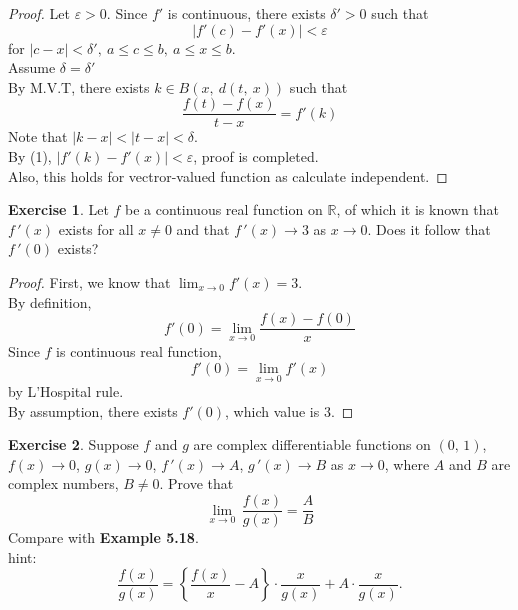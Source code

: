 \documentclass[12pt]{book}
\theoremstyle{definition}
\newtheorem{exercise}{Exercise}
\newcommand{\R}{\mathbb{R}}
\begin{document}
	\begin{proof}
		Let $\varepsilon>0$.
		Since $f'$ is continuous, there exists $\delta'>0$ such that
		\begin{equation}
			|f'(c)-f'(x)|<\varepsilon
		\end{equation}
		for $|c-x|<\delta',~a\leq c\leq b,~a\leq x\leq b$.\\
		Assume $\delta=\delta'$\\
		By M.V.T, there exists $k\in B(x,~ d(t,~x))$ such that $$\dfrac{f(t)-f(x)}{t-x}=f'(k)$$
		Note that $|k-x|<|t-x|<\delta$.\\
		By (1), $|f'(k)-f'(x)|<\varepsilon$, proof is completed.\\
		Also, this holds for vectror-valued function as calculate independent.
	\end{proof}
	\newpage
	\begin{exercise}
		Let $f$ be a continuous real function on $\R$, of which it is known that $f\,'(x)$ exists for all $x\neq 0$ and that $f\,'(x)\rightarrow3$ as $x\rightarrow0$. Does it follow that $f\,'(0)$ exists?
	\end{exercise}
	\begin{proof}
		First, we know that $\displaystyle\lim_{x\rightarrow 0} f'(x)=3$.\\
		By definition, $$f'(0)=\displaystyle\lim_{x\rightarrow 0}\dfrac{f(x)-f(0)}{x}$$
		Since $f$ is continuous real function, $$f'(0)=\displaystyle\lim_{x\rightarrow 0}f'(x)$$ by L'Hospital rule.\\
		By assumption, there exists $f'(0)$, which value is $3$.
	\end{proof}
	\newpage
	\begin{exercise}
		Suppose $f$ and $g$ are complex differentiable functions on $(0,\,1)$, $f(x) \rightarrow0$, $g(x)\rightarrow0$, $f\,'(x)\rightarrow A$, $g\,'(x)\rightarrow B$ as $x\rightarrow 0$, where $A$ and $B$ are complex numbers, $B\neq 0$. Prove that
		\begin{equation*}
			\lim_{x\rightarrow 0}\,\dfrac{f(x)}{g(x)}=\dfrac{A}{B}
		\end{equation*}
		Compare with \textbf{Example 5.18}.\\
		hint:\begin{equation*}
			\dfrac{f(x)}{g(x)}=\left\{\dfrac{f(x)}{x}-A\right\}\cdot \dfrac{x}{g(x)}+A\cdot \dfrac{x}{g(x)}.
		\end{equation*}
	\end{exercise}
\end{document}
